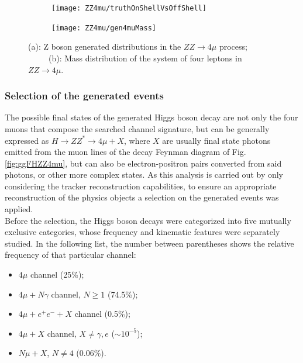 \documentclass[a4paper,twoside,12pt]{article}
\begin{document}
\begin{figure}
\begin{subfigure}{.5\linewidth}
\texttt{[image: ZZ4mu/truthOnShellVsOffShell]}
\caption{}
\label{fig:ZZ4mu:truthOnShellVsOffShell}
\end{subfigure}
\begin{subfigure}{.5\linewidth}
\centering
\texttt{[image: ZZ4mu/gen4muMass]}
\caption{}
\label{fig:ZZ4mu:gen4muMass}
\end{subfigure}
\caption{(a): Z boson generated distributions in the $ZZ \rightarrow 4\mu$ process;\\
\ \ \ \ \ (b): Mass distribution of the system of four leptons in $ZZ \rightarrow 4\mu$.}
\label{fig:ZZ4mu:genMasses}
\end{figure}


\subsubsection{Selection of the generated events}
The possible final states of the generated Higgs boson decay are not only the four muons that 
compose the searched channel signature, but can be generally expressed as $H \rightarrow
ZZ^* \rightarrow 4\mu + X$, where $X$ are usually final state photons emitted from the muon
lines of the decay Feynman diagram of Fig.\ref{fig:ggFHZZ4mu}, but can also be electron-positron pairs converted from said photons, or other more complex states. As this analysis
is carried out by only considering the tracker reconstruction capabilities, to ensure 
an appropriate reconstruction of the physics objects a selection on the 
generated events was applied.\\

Before the selection, the Higgs boson decays were categorized into five 
mutually exclusive categories, whose frequency and kinematic features were separately 
studied. In the following list, the number between parentheses shows the relative frequency
of that particular channel:

\begin{itemize}
\item $4\mu$ channel (25\%);
\item $4\mu + N\gamma$ channel, $N \geq 1$ (74.5\%);
\item $4\mu + e^+e^- + X$ channel (0.5\%);
\item $4\mu + X$ channel, $X \neq \gamma, e$ ($\sim 10^{-5}$);
\item $N\mu + X$, $N \neq 4$ (0.06\%).
\end{itemize}
\end{document}
